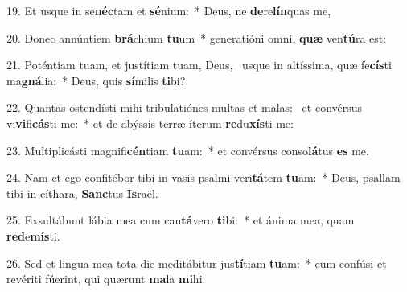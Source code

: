 19. Et usque in se\textbf{néc}tam et \textbf{sé}nium:~*  Deus, ne \textbf{de}re\textbf{lín}quas me,\

20. Donec annúntiem \textbf{brá}chium \textbf{tu}um~*  generatióni omni, \textbf{quæ} ven\textbf{tú}ra est:\

21. Poténtiam tuam, et justítiam tuam, Deus, \dag\  usque in altíssima, quæ fe\textbf{cís}ti ma\textbf{gná}lia:~*  Deus, quis \textbf{sí}milis \textbf{ti}bi?\

22. Quantas ostendísti mihi tribulatiónes multas et malas: \dag\  et convérsus vi\textbf{vi}fi\textbf{cás}ti me:~*  et de abýssis terræ íterum \textbf{re}du\textbf{xís}ti me:\

23. Multiplicásti magnifi\textbf{cén}tiam \textbf{tu}am:~*  et convérsus conso\textbf{lá}tus \textbf{es} me.\

24. Nam et ego confitébor tibi in vasis psalmi veri\textbf{tá}tem \textbf{tu}am:~*  Deus, psallam tibi in cíthara, \textbf{Sanc}tus \textbf{Is}raël.\

25. Exsultábunt lábia mea cum can\textbf{tá}vero \textbf{ti}bi:~*  et ánima mea, quam \textbf{red}e\textbf{mís}ti.\

26. Sed et lingua mea tota die meditábitur jus\textbf{tí}tiam \textbf{tu}am:~*  cum confúsi et revériti fúerint, qui quærunt \textbf{ma}la \textbf{mi}hi.\

